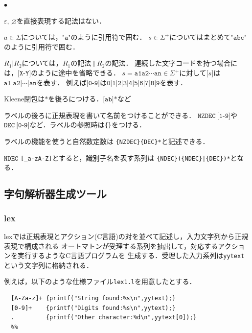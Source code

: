 \documentclass[a4j,dvipdfmx]{jbook}
\begin{document}
\begin{list}{$\bullet$}{}
  \item $\varepsilon$, $\varnothing$を直接表現する記法はない．
  \item $a\in\Sigma$については，$\texttt{"a"}$のように引用符で囲む．
        $s\in\Sigma^+$についてはまとめて$\texttt{"abc"}$のように引用符で囲む．
  \item $R_1|R_2$については，$R_1$の記法\,\texttt{|}\,$R_2$の記法．
        連続した文字コードを持つ場合には，$\texttt{[X-Y]}$のように途中を省略できる．
        $s=\texttt{a1}\texttt{a2}\cdots\texttt{an}\in\Sigma^+$に対して$\texttt{[}s\texttt{]}$は$\texttt{a1|a2|}\cdots\texttt{|an}$を表す．
        例えば$\texttt{[0-9]}$は$\texttt{0|1|2|3|4|5|6|7|8|9}$を表す．
  \item Kleene閉包は$\texttt{*}$を後ろにつける．$\texttt{[ab]*}$など
  \item ラベルの後ろに正規表現を書いて名前をつけることができる．
        $\texttt{NZDEC}\ \texttt{[1-9]}$や
        $\texttt{DEC}\ \texttt{[0-9]}$など．ラベルの参照時は\verb|{|\verb|}|をつける．
\end{list}

ラベルの機能を使うと自然数定数は \verb:{NZDEC}{DEC}*:と記述できる．

$\texttt{NDEC}$ \verb:[_a-zA-Z]:とすると，識別子名を表す系列は
\verb;{NDEC}({NDEC}|{DEC})*;となる．


\subsection{字句解析器生成ツール}

\subsubsection{lex}

lexでは正規表現とアクション(C言語)の対を並べて記述し，入力文字列から正規表現で構成される
オートマトンが受理する系列を抽出して，対応するアクションを実行するようなC言語プログラムを
生成する．受理した入力系列は\texttt{yytext}という文字列に格納される．

例えば，以下のような仕様ファイル\texttt{lex1.l}を用意したとする．

\begin{Verbatim}[frame=single]
  %%
  [A-Za-z]+ {printf("String found:%s\n",yytext);}
  [0-9]+    {printf("Digits found:%s\n",yytext);}
  .         {printf("Other character:%d\n",yytext[0]);}
  %%
\end{Verbatim}
\end{document}
